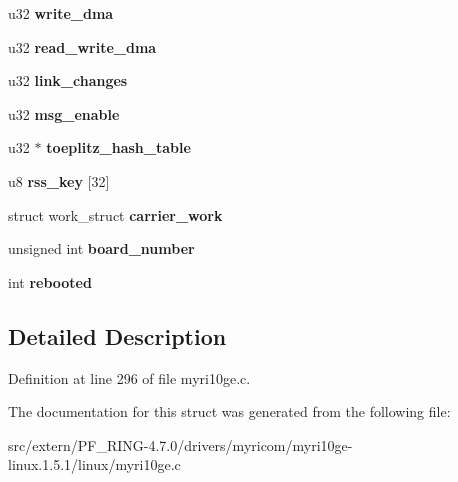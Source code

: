 \begin{DoxyCompactItemize}
\item 
\hypertarget{structmyri10ge__priv_a0708dff58e0c85e22b20f1bd4eb9b7ed}{
u32 {\bfseries write\_\-dma}}
\label{structmyri10ge__priv_a0708dff58e0c85e22b20f1bd4eb9b7ed}

\item 
\hypertarget{structmyri10ge__priv_a4aea3487e844f7308810c163a5f017d3}{
u32 {\bfseries read\_\-write\_\-dma}}
\label{structmyri10ge__priv_a4aea3487e844f7308810c163a5f017d3}

\item 
\hypertarget{structmyri10ge__priv_af0ceec09296640f235f70611cb32b1d2}{
u32 {\bfseries link\_\-changes}}
\label{structmyri10ge__priv_af0ceec09296640f235f70611cb32b1d2}

\item 
\hypertarget{structmyri10ge__priv_a9741dd9157d73251380afa9ab44606a5}{
u32 {\bfseries msg\_\-enable}}
\label{structmyri10ge__priv_a9741dd9157d73251380afa9ab44606a5}

\item 
\hypertarget{structmyri10ge__priv_abe3775c2e9327635c8d7d2082b1ebc5c}{
u32 $\ast$ {\bfseries toeplitz\_\-hash\_\-table}}
\label{structmyri10ge__priv_abe3775c2e9327635c8d7d2082b1ebc5c}

\item 
\hypertarget{structmyri10ge__priv_a24a6cbdc48ddd2a12d2fa26601953a96}{
u8 {\bfseries rss\_\-key} \mbox{[}32\mbox{]}}
\label{structmyri10ge__priv_a24a6cbdc48ddd2a12d2fa26601953a96}

\item 
\hypertarget{structmyri10ge__priv_a93c464dd5119bc67274490b2a0f98a13}{
struct work\_\-struct {\bfseries carrier\_\-work}}
\label{structmyri10ge__priv_a93c464dd5119bc67274490b2a0f98a13}

\item 
\hypertarget{structmyri10ge__priv_afb8ea210d7486be7b0db9774d7cf3bfc}{
unsigned int {\bfseries board\_\-number}}
\label{structmyri10ge__priv_afb8ea210d7486be7b0db9774d7cf3bfc}

\item 
\hypertarget{structmyri10ge__priv_a96a719b8adc7898e1c02d942a86d69b1}{
int {\bfseries rebooted}}
\label{structmyri10ge__priv_a96a719b8adc7898e1c02d942a86d69b1}

\end{DoxyCompactItemize}


\subsection{Detailed Description}


Definition at line 296 of file myri10ge.c.



The documentation for this struct was generated from the following file:\begin{DoxyCompactItemize}
\item 
src/extern/PF\_\-RING-\/4.7.0/drivers/myricom/myri10ge-\/linux.1.5.1/linux/myri10ge.c\end{DoxyCompactItemize}

